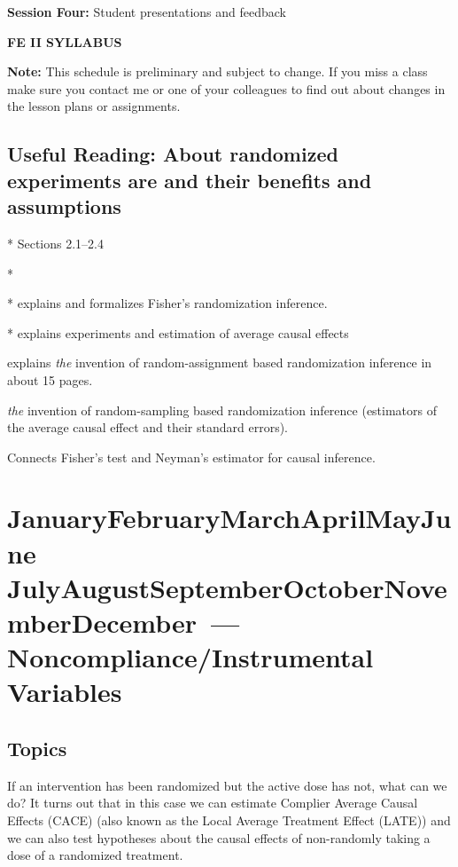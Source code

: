 \documentclass[10pt]{article}
\def\themonth{\ifcase\month\or
        January\or February\or March\or April\or May\or June\or
    July\or August\or September\or October\or November\or December\fi}
\begin{document}
\textbf{Session Four: } Student presentations and feedback

\centerline{\textbf{FE II SYLLABUS}}

        \textbf{Note: } This schedule is preliminary and subject to change. If
        you miss a class make sure you contact me or one of your colleagues to
        find out about changes in the lesson plans or assignments.

    \subsection{Useful Reading: About randomized experiments are and their benefits and assumptions}

    * Sections 2.1--2.4

    *

    * explains and formalizes Fisher's randomization inference.

    * explains experiments and estimation of average causal effects

     explains \emph{the} invention of
    random-assignment based randomization inference in about 15 pages.

     \emph{the} invention of random-sampling
    based randomization inference (estimators of the average causal effect and
    their standard errors).

      Connects Fisher's test and Neyman's
     estimator for causal inference.

    \AdvanceDate[7]
    \section{\themonth~\the\day---Noncompliance/Instrumental Variables}

    \subsection{Topics} If an intervention has been randomized but the active
    dose has not, what can we do? It turns out that in this case we can
    estimate Complier Average Causal Effects (CACE) (also known as the Local
    Average Treatment Effect (LATE)) and we can also test hypotheses about the
    causal effects of non-randomly taking a dose of a randomized treatment.
\end{document}
